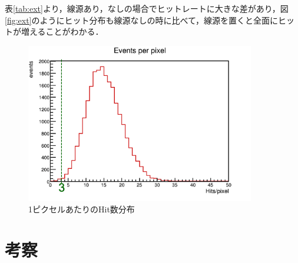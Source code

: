 表\ref{tab:ext}より，線源あり，なしの場合でヒットレートに大きな差があり，図\ref{fig:ext}のようにヒット分布も線源なしの時に比べて，線源を置くと全面にヒットが増えることがわかる．

\begin{figure}[h]
  \centering
  \includegraphics[width=10cm]{./figure/selfperpix.png}
  \caption{1ピクセルあたりのHit数分布}
  \label{fig:selfhitfreq}
\end{figure}


\section{考察}
\label{sec:extsum}

